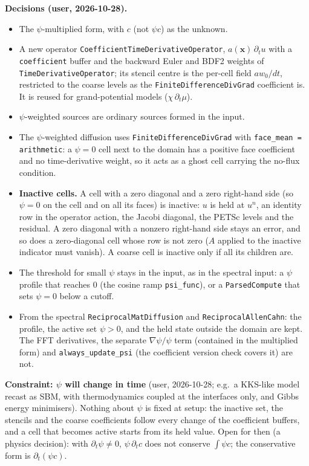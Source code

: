 \documentclass[11pt]{article}
\begin{document}
\textbf{Decisions (user, 2026-10-28).}
\begin{itemize}[leftmargin=*]
\item The $\psi$-multiplied form, with $c$ (not $\psi c$) as the unknown.
\item A new operator \texttt{CoefficientTimeDerivativeOperator}, $a(\mathbf{x})\,\partial_t u$
with a \texttt{coefficient} buffer and the backward Euler and BDF2 weights of
\texttt{TimeDerivativeOperator}; its stencil centre is the per-cell field $a w_0/dt$, restricted
to the coarse levels as the \texttt{FiniteDifferenceDivGrad} coefficient is. It is reused for
grand-potential models ($\chi\,\partial_t\mu$).
\item $\psi$-weighted sources are ordinary sources formed in the input.
\item The $\psi$-weighted diffusion uses \texttt{FiniteDifferenceDivGrad} with
\texttt{face\_mean = arithmetic}: a $\psi = 0$ cell next to the domain has a positive face
coefficient and no time-derivative weight, so it acts as a ghost cell carrying the no-flux
condition.
\item \textbf{Inactive cells.} A cell with a zero diagonal and a zero right-hand side (so
$\psi = 0$ on the cell and on all its faces) is inactive: $u$ is held at $u^n$, an identity row
in the operator action, the Jacobi diagonal, the PETSc levels and the residual. A zero diagonal
with a nonzero right-hand side stays an error, and so does a zero-diagonal cell whose row is not
zero ($A$ applied to the inactive indicator must vanish). A coarse cell is inactive only if all
its children are.
\item The threshold for small $\psi$ stays in the input, as in the spectral input: a $\psi$
profile that reaches 0 (the cosine ramp \texttt{psi\_func}), or a \texttt{ParsedCompute} that
sets $\psi = 0$ below a cutoff.
\item From the spectral \texttt{ReciprocalMatDiffusion} and \texttt{ReciprocalAllenCahn}: the
profile, the active set $\psi > 0$, and the held state outside the domain are kept. The FFT
derivatives, the separate $\nabla\psi/\psi$ term (contained in the multiplied form) and
\texttt{always\_update\_psi} (the coefficient version check covers it) are not.
\end{itemize}

\textbf{Constraint: $\psi$ will change in time} (user, 2026-10-28; e.g.\ a KKS-like model
recast as SBM, with thermodynamics coupled at the interfaces only, and Gibbs energy minimisers).
Nothing about $\psi$ is fixed at setup: the inactive set, the stencils and the coarse
coefficients follow every change of the coefficient buffers, and a cell that becomes active
starts from its held value. Open for then (a physics decision): with $\partial_t\psi \ne 0$,
$\psi\,\partial_t c$ does not conserve $\int\psi c$; the conservative form is $\partial_t(\psi c)$.
\end{document}
